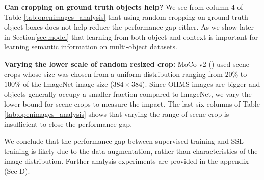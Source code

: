 \textbf{Can cropping on ground truth objects help?} 
We see from column 4 of Table \ref{tab:openimages_analysis} that using random cropping on ground truth object boxes does not help reduce the performance gap either. As we show later in Section\ref{sec:model} that learning from both object and context is important for learning semantic information on multi-object datasets. 

\textbf{Varying the lower scale of random resized crop:}  MoCo-v2 (\cite{chen2020improved}) used scene crops whose size was chosen from a uniform distribution ranging from $20\%$ to $100\%$ of the ImageNet image size ($384 \times 384$). Since OHMS images are bigger and objects generally occupy a smaller fraction compared to ImageNet, we vary the lower bound for scene crops to measure the impact. The last six columns of Table \ref{tab:openimages_analysis} shows that varying the range of scene crop is insufficient to close the performance gap. 

We conclude that the performance gap between supervised training and SSL training is likely due to the data augmentation, rather than characteristics of the image distribution. Further analysis experiments are provided in the appendix (Sec D).


      
